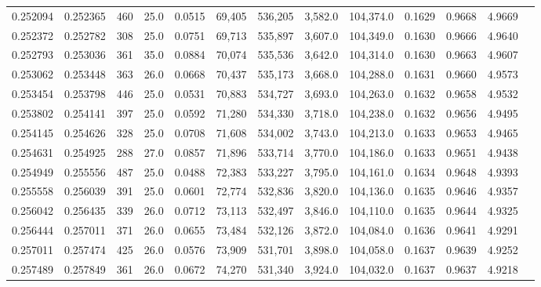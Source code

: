 \begin{tabular}{rrrrrrrrrrrrr}
0.252094 & 0.252365 &   460 & 25.0 &                                     0.0515 &  69,405 & 536,205 &   3,582.0 & 104,374.0 & 0.1629 & 0.9668 & 4.9669 \\
0.252372 & 0.252782 &   308 & 25.0 &                                     0.0751 &  69,713 & 535,897 &   3,607.0 & 104,349.0 & 0.1630 & 0.9666 & 4.9640 \\
0.252793 & 0.253036 &   361 & 35.0 &                                     0.0884 &  70,074 & 535,536 &   3,642.0 & 104,314.0 & 0.1630 & 0.9663 & 4.9607 \\
0.253062 & 0.253448 &   363 & 26.0 &                                     0.0668 &  70,437 & 535,173 &   3,668.0 & 104,288.0 & 0.1631 & 0.9660 & 4.9573 \\
0.253454 & 0.253798 &   446 & 25.0 &                                     0.0531 &  70,883 & 534,727 &   3,693.0 & 104,263.0 & 0.1632 & 0.9658 & 4.9532 \\
0.253802 & 0.254141 &   397 & 25.0 &                                     0.0592 &  71,280 & 534,330 &   3,718.0 & 104,238.0 & 0.1632 & 0.9656 & 4.9495 \\
0.254145 & 0.254626 &   328 & 25.0 &                                     0.0708 &  71,608 & 534,002 &   3,743.0 & 104,213.0 & 0.1633 & 0.9653 & 4.9465 \\
0.254631 & 0.254925 &   288 & 27.0 &                                     0.0857 &  71,896 & 533,714 &   3,770.0 & 104,186.0 & 0.1633 & 0.9651 & 4.9438 \\
0.254949 & 0.255556 &   487 & 25.0 &                                     0.0488 &  72,383 & 533,227 &   3,795.0 & 104,161.0 & 0.1634 & 0.9648 & 4.9393 \\
0.255558 & 0.256039 &   391 & 25.0 &                                     0.0601 &  72,774 & 532,836 &   3,820.0 & 104,136.0 & 0.1635 & 0.9646 & 4.9357 \\
0.256042 & 0.256435 &   339 & 26.0 &                                     0.0712 &  73,113 & 532,497 &   3,846.0 & 104,110.0 & 0.1635 & 0.9644 & 4.9325 \\
0.256444 & 0.257011 &   371 & 26.0 &                                     0.0655 &  73,484 & 532,126 &   3,872.0 & 104,084.0 & 0.1636 & 0.9641 & 4.9291 \\
0.257011 & 0.257474 &   425 & 26.0 &                                     0.0576 &  73,909 & 531,701 &   3,898.0 & 104,058.0 & 0.1637 & 0.9639 & 4.9252 \\
0.257489 & 0.257849 &   361 & 26.0 &                                     0.0672 &  74,270 & 531,340 &   3,924.0 & 104,032.0 & 0.1637 & 0.9637 & 4.9218 \\

\end{tabular}

